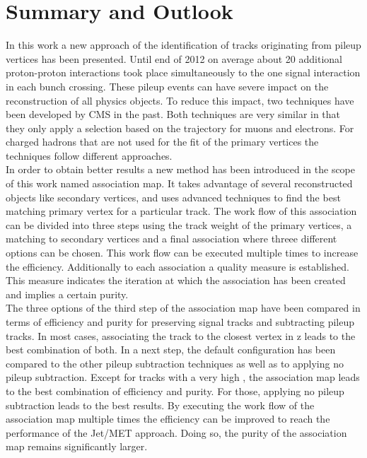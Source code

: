 \chapter{Summary and Outlook \label{sec:SandO}}

In this work a new approach of the identification of tracks originating from pileup vertices has been presented. Until end of 2012 on average about 20 additional proton-proton interactions took place simultaneously to the one signal interaction in each bunch crossing. These pileup events can have severe impact on the reconstruction of all physics objects. To reduce this impact, two techniques have been developed by CMS in the past. Both techniques are very similar in that they only apply a selection based on the trajectory for muons and electrons. For charged hadrons that are not used for the fit of the primary vertices the techniques follow different approaches. \\
In order to obtain better results a new method has been introduced in the scope of this work named association map. It takes advantage of several reconstructed objects like secondary vertices, and uses advanced techniques to find the best matching primary vertex for a particular track. The work flow of this association can be divided into three steps using the track weight of the primary vertices, a matching to secondary vertices and a final association where threee different options can be chosen. This work flow can be executed multiple times to increase the efficiency. Additionally to each association a quality measure is established. This measure indicates the iteration at which the association has been created and implies a certain purity. \\
The three options of the third step of the association map have been compared in terms of efficiency and purity for preserving signal tracks and subtracting pileup tracks. In most cases, associating the track to the closest vertex in z leads to the best combination of both.  In a next step, the default configuration has been compared to the other pileup subtraction techniques as well as to applying no pileup subtraction. Except for tracks with a very high \pt{}, the association map leads to the best combination of efficiency and purity. For those, applying no pileup subtraction leads to the best results. By executing the work flow of the association map multiple times the efficiency can be improved to reach the performance of the Jet/MET approach. Doing so, the purity of the association map remains significantly larger. \\
